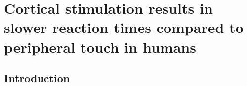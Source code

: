 \textpages
 
 
\chapter {Cortical stimulation results in slower reaction times compared to peripheral touch in humans}

\section{Introduction}